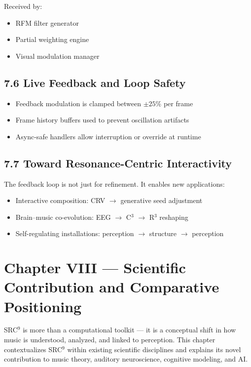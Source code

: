 \documentclass[10pt]{article}
\begin{document}
Received by:

\begin{itemize}
    \item RFM filter generator
    \item Partial weighting engine
    \item Visual modulation manager
\end{itemize}

\subsection*{7.6 Live Feedback and Loop Safety}

\begin{itemize}
    \item Feedback modulation is clamped between $\pm 25\%$ per frame
    \item Frame history buffers used to prevent oscillation artifacts
    \item Async-safe handlers allow interruption or override at runtime
\end{itemize}

\subsection*{7.7 Toward Resonance-Centric Interactivity}

The feedback loop is not just for refinement. It enables new applications:

\begin{itemize}
    \item Interactive composition: CRV $\rightarrow$ generative seed adjustment
    \item Brain–music co-evolution: EEG $\rightarrow$ C$^3$ $\rightarrow$ R$^3$ reshaping
    \item Self-regulating installations: perception $\rightarrow$ structure $\rightarrow$ perception
\end{itemize}

\section*{Chapter VIII — Scientific Contribution and Comparative Positioning}

SRC$^{9}$ is more than a computational toolkit — it is a conceptual shift in how music is understood, analyzed, and linked to perception. This chapter contextualizes SRC$^{9}$ within existing scientific disciplines and explains its novel contribution to music theory, auditory neuroscience, cognitive modeling, and AI.
\end{document}
